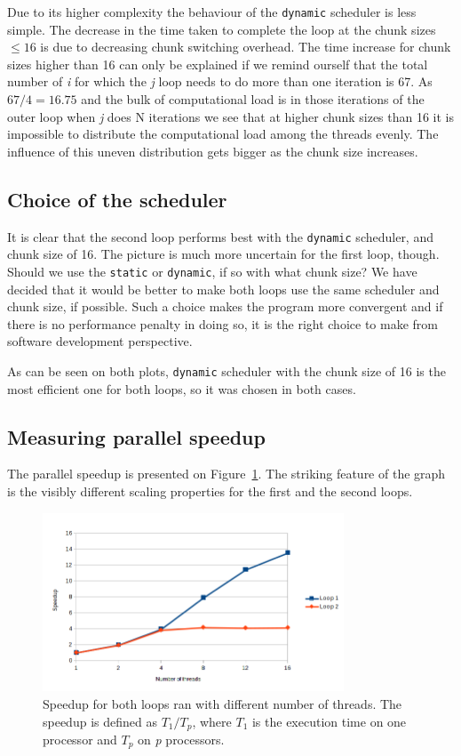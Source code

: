 \documentclass[11pt,a4paper]{article}
\begin{document}
Due to its higher complexity the behaviour of the \texttt{dynamic} scheduler is less simple. The decrease in the time taken to complete the loop at the chunk sizes \(\leq 16\) is due to decreasing chunk switching overhead. The time increase for chunk sizes higher than 16 can only be explained if we remind ourself that the total number of \textit{i} for which the \textit{j} loop needs to do more than one iteration is 67. As \(67 / 4= 16.75 \) and the bulk of computational load is in those iterations of the outer loop when \textit{j} does N iterations we see that at higher chunk sizes than 16 it is impossible to distribute the computational load among the threads evenly. The influence of this uneven distribution gets bigger as the chunk size increases.

\subsection{Choice of the scheduler}
It is clear that the second loop performs best with the \texttt{dynamic} scheduler, and chunk size of 16. The picture is much more uncertain for the first loop, though. Should we use the \texttt{static} or \texttt{dynamic}, if so with what chunk size? We have decided that it would be better to make both loops use the same scheduler and chunk size, if possible. Such a choice makes the program more convergent and if there is no performance penalty in doing so, it is the right choice to make from software development perspective.

As can be seen on both plots, \texttt{dynamic} scheduler with the chunk size of 16 is the most efficient one for both loops, so it was chosen in both cases.

\subsection{Measuring parallel speedup}
The parallel speedup is presented on Figure~\ref{speedup}. The striking feature of the graph is the visibly different scaling properties for the first and the second loops. 

\begin{figure}[h!]
    \begin{center}
        \includegraphics[width=0.8\textwidth]{speedup.png}
    \end{center}
    \caption{Speedup for both loops ran with different number of threads. The speedup is defined as \(T_1 / T_p\), where \(T_1\) is the execution time on one processor and \(T_p\) on \textit{p} processors.}
    \label{speedup}
\end{figure}
\end{document}
